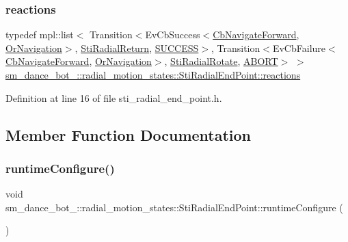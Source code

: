 \subsubsection{\texorpdfstring{reactions}{reactions}}
{\footnotesize\ttfamily typedef mpl\+::list$<$ Transition$<$Ev\+Cb\+Success$<$\hyperlink{classcl__move__base__z_1_1CbNavigateForward}{Cb\+Navigate\+Forward}, \hyperlink{classsm__dance__bot__2_1_1OrNavigation}{Or\+Navigation}$>$, \hyperlink{structsm__dance__bot__2_1_1radial__motion__states_1_1StiRadialReturn}{Sti\+Radial\+Return}, \hyperlink{structsmacc_1_1default__transition__tags_1_1SUCCESS}{S\+U\+C\+C\+E\+SS}$>$, Transition$<$Ev\+Cb\+Failure$<$\hyperlink{classcl__move__base__z_1_1CbNavigateForward}{Cb\+Navigate\+Forward}, \hyperlink{classsm__dance__bot__2_1_1OrNavigation}{Or\+Navigation}$>$, \hyperlink{structsm__dance__bot__2_1_1radial__motion__states_1_1StiRadialRotate}{Sti\+Radial\+Rotate}, \hyperlink{structsmacc_1_1default__transition__tags_1_1ABORT}{A\+B\+O\+RT}$>$ $>$ \hyperlink{structsm__dance__bot__2_1_1radial__motion__states_1_1StiRadialEndPoint_ab1c4077f375f1baaec5de4b81b1ef7e7}{sm\+\_\+dance\+\_\+bot\+\_\+::radial\+\_\+motion\+\_\+states\+::\+Sti\+Radial\+End\+Point\+::reactions}}



Definition at line 16 of file sti\+\_\+radial\+\_\+end\+\_\+point.\+h.



\subsection{Member Function Documentation}
\mbox{\label{structsm__dance__bot__2_1_1radial__motion__states_1_1StiRadialEndPoint_a2344eeef3dee9a2b1bb4956e9cbd4639}} 
\subsubsection{\texorpdfstring{runtime\+Configure()}{runtimeConfigure()}}
{\footnotesize\ttfamily void sm\+\_\+dance\+\_\+bot\+\_\+::radial\+\_\+motion\+\_\+states\+::\+Sti\+Radial\+End\+Point\+::runtime\+Configure (\begin{DoxyParamCaption}{ }\end{DoxyParamCaption})\hspace{0.3cm}{\ttfamily [inline]}}



